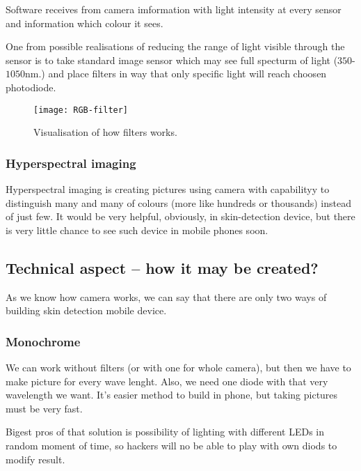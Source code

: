             Software receives from camera imformation with light intensity at every
            sensor and information which colour it sees.

            One from possible realisations of reducing the range
            of light visible through the sensor is to take standard image sensor which
            may see full specturm of light ($350$-$1050$nm.) and
            place filters in way that only specific light will reach choosen photodiode.

            \begin{figure}[H]
                \caption{Visualisation of how filters works.}
                \centering
                \texttt{[image: RGB-filter]}
                \label{fig:RGB-filter}
            \end{figure}

        \subsubsection*{Hyperspectral imaging}
            Hyperspectral imaging is creating pictures using camera with
            capabilityy to distinguish many and many of colours (more like hundreds or thousands)
            instead of just few.
            It would be very helpful, obviously, in skin-detection device,
            but there is very little chance to see such device in mobile phones soon.

    \subsection{Technical aspect -- how it may be created?}
        As we know how camera works, we can say that there are only two ways of
        building skin detection mobile device.
        \subsubsection*{Monochrome}
            We can work without filters (or with one for whole camera),
            but then we have to make picture for every wave lenght.
            Also, we need one diode with that very wavelength we want.
            It's easier method to build in phone, but taking pictures
            must be very fast.

            Bigest pros of that solution is possibility of lighting
            with different LEDs in random moment of time, so hackers
            will no be able to play with own diods to modify result.


